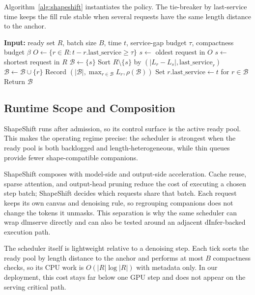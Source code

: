 \documentclass[a4paper]{llncs}
\begin{document}
Algorithm~\ref{alg:shapeshift} instantiates the policy. The tie-breaker by last-service time keeps the fill rule stable when several requests have the same length distance to the anchor.

\begin{algorithm}[t]
\caption{ShapeShift Active-Shape Step Scheduler}
\label{alg:shapeshift}
\begin{algorithmic}[1]
\STATE \textbf{Input:} ready set $R$, batch size $B$, time $t$, service-gap budget $\tau$, compactness budget $\beta$
\STATE $O \leftarrow \{r\in R: t-r.\mathrm{last\_service}\ge \tau\}$
  \STATE $s \leftarrow$ oldest request in $O$
\ELSE
  \STATE $s \leftarrow$ shortest request in $R$
\ENDIF
\STATE $\mathcal{B}\leftarrow \{s\}$
\STATE Sort $R\setminus\{s\}$ by $(|L_r-L_s|, \mathrm{last\_service}_r)$
    \STATE $\mathcal{B}\leftarrow\mathcal{B}\cup\{r\}$
  \ENDIF
\ENDFOR
\STATE Record $(|\mathcal{B}|,\max_{r\in\mathcal{B}}L_r,\rho(\mathcal{B}))$
\STATE Set $r.\mathrm{last\_service}\leftarrow t$ for $r\in\mathcal{B}$
\STATE Return $\mathcal{B}$
\end{algorithmic}
\end{algorithm}

\subsection{Runtime Scope and Composition}

ShapeShift runs after admission, so its control surface is the active ready pool. This makes the operating regime precise: the scheduler is strongest when the ready pool is both backlogged and length-heterogeneous, while thin queues provide fewer shape-compatible companions.

ShapeShift composes with model-side and output-side acceleration. Cache reuse, sparse attention, and output-head pruning reduce the cost of executing a chosen step batch; ShapeShift decides which requests share that batch. Each request keeps its own canvas and denoising rule, so regrouping companions does not change the tokens it unmasks. This separation is why the same scheduler can wrap dlmserve directly and can also be tested around an adjacent dInfer-backed execution path.

The scheduler itself is lightweight relative to a denoising step. Each tick sorts the ready pool by length distance to the anchor and performs at most $B$ compactness checks, so its CPU work is $O(|R|\log|R|)$ with metadata only. In our deployment, this cost stays far below one GPU step and does not appear on the serving critical path.
\end{document}
